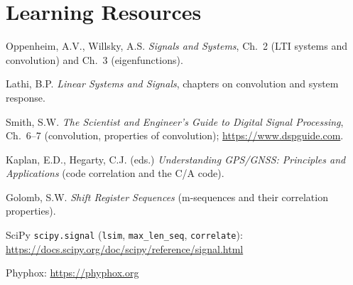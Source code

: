\documentclass[11pt,a4paper]{article}
\begin{document}
\section*{Learning Resources}
\begin{resources}
  \item Oppenheim, A.V., Willsky, A.S. \emph{Signals and Systems}, Ch.~2 (LTI systems and convolution) and Ch.~3 (eigenfunctions).
  \item Lathi, B.P. \emph{Linear Systems and Signals}, chapters on convolution and system response.
  \item Smith, S.W. \emph{The Scientist and Engineer's Guide to Digital Signal Processing}, Ch.~6--7 (convolution, properties of convolution); \url{https://www.dspguide.com}.
\end{resources}
\begin{resources}
  \item Kaplan, E.D., Hegarty, C.J. (eds.) \emph{Understanding GPS/GNSS: Principles and Applications} (code correlation and the C/A code).
  \item Golomb, S.W. \emph{Shift Register Sequences} (m-sequences and their correlation properties).
\end{resources}
\begin{resources}
  \item SciPy \texttt{scipy.signal} (\texttt{lsim}, \texttt{max\_len\_seq}, \texttt{correlate}): \url{https://docs.scipy.org/doc/scipy/reference/signal.html}
  \item Phyphox: \url{https://phyphox.org}
\end{resources}

\evaluation
\end{document}
